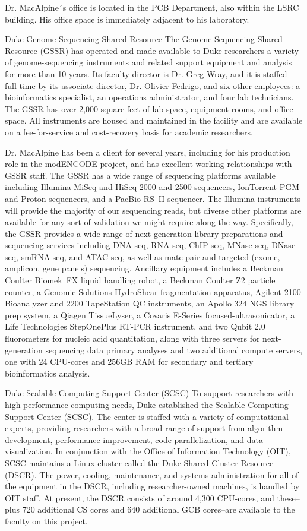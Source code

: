  Dr. MacAlpine´s office is located in the PCB Department, also within the LSRC building.  His office space is immediately adjacent to his laboratory.
 
 
 Duke Genome Sequencing Shared Resource  The Genome Sequencing Shared Resource (GSSR)  has operated and made available to Duke researchers a variety of genome-sequencing instruments and related support equipment and analysis for more than 10 years.  Its faculty director is Dr. Greg Wray, and it is staffed full-time by its associate director, Dr. Olivier Fedrigo, and six other employees: a bioinformatics specialist, an operations administrator, and four lab technicians.  The GSSR has over 2,000 square feet of lab space, equipment rooms, and office space. All instruments are housed and maintained in the facility and are available on a fee-for-service and cost-recovery basis for academic researchers.

Dr. MacAlpine has been a client for several years, including for his production role in the modENCODE project, and has excellent working relationships with GSSR staff. The GSSR has a wide range of sequencing platforms available including Illumina MiSeq and HiSeq 2000 and 2500 sequencers, IonTorrent PGM and Proton sequencers, and a PacBio RS~II sequencer.  The Illumina instruments will provide the majority of our sequencing reads, but diverse other platforms are available for any sort of validation we might require along the way.  Specifically, the GSSR provides a wide range of next-generation library preparations and sequencing services including DNA-seq, RNA-seq, ChIP-seq, MNase-seq, DNase-seq, smRNA-seq, and ATAC-seq, as well as mate-pair and targeted (exome, amplicon, gene panels) sequencing.  Ancillary equipment includes a Beckman Coulter Biomek~FX liquid handling robot, a Beckman Coulter Z2 particle counter, a Genomic Solutions HydroShear fragmentation apparatus, Agilent 2100 Bioanalyzer and 2200 TapeStation QC instruments, an Apollo 324 NGS library prep system, a Qiagen TissueLyser, a Covaris E-Series focused-ultrasonicator, a Life Technologies StepOnePlus RT-PCR instrument, and two Qubit 2.0 fluorometers for nucleic acid quantitation, along with three servers for next-generation sequencing data primary analyses and two additional compute servers, one with 24 CPU-cores and 256GB RAM for secondary and tertiary bioinformatics analysis.

Duke Scalable Computing Support Center (SCSC)  To support researchers with high-performance computing needs, Duke established the Scalable Computing Support Center (SCSC).  The center is staffed with a variety of computational experts, providing researchers with a broad range of support from algorithm development, performance improvement, code parallelization, and data visualization.  In conjunction with the Office of Information Technology (OIT), SCSC maintains a Linux cluster called the Duke Shared Cluster Resource (DSCR).  The power, cooling, maintenance, and systems administration for all of the equipment in the DSCR, including researcher-owned machines, is handled by OIT staff.  At present, the DSCR consists of around 4,300 CPU-cores, and these--plus 720 additional CS cores and 640 additional GCB cores--are available to the faculty on this project.
 
